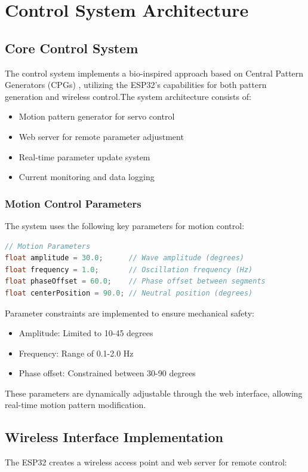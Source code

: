 \documentclass[12pt,a4paper]{report}
\begin{document}
\section{Control System Architecture}
\subsection{Core Control System}
The control system implements a bio-inspired approach based on Central Pattern Generators (CPGs) \cite{MARDER2001R986}, utilizing the ESP32's capabilities for both pattern generation and wireless control.The system architecture consists of:
\begin{itemize}
    \item Motion pattern generator for servo control
    \item Web server for remote parameter adjustment
    \item Real-time parameter update system
    \item Current monitoring and data logging
\end{itemize}


\subsubsection{Motion Control Parameters}
The system uses the following key parameters for motion control:

\begin{lstlisting}[language=C++]
// Motion Parameters
float amplitude = 30.0;      // Wave amplitude (degrees)
float frequency = 1.0;       // Oscillation frequency (Hz)
float phaseOffset = 60.0;    // Phase offset between segments
float centerPosition = 90.0; // Neutral position (degrees)
\end{lstlisting}
Parameter constraints are implemented to ensure mechanical safety:
\begin{itemize}
    \item Amplitude: Limited to 10-45 degrees
    \item Frequency: Range of 0.1-2.0 Hz
    \item Phase offset: Constrained between 30-90 degrees
\end{itemize}

These parameters are dynamically adjustable through the web interface, allowing real-time motion pattern modification.

\subsection{Wireless Interface Implementation}
The ESP32 creates a wireless access point and web server for remote control:
\end{document}
